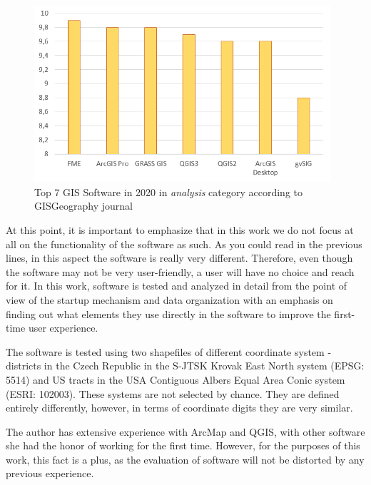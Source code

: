 \documentclass[a4paper,10pt,twoside]{article}
\begin{document}
\begin{figure}[hbt!] 
\begin{center}
\includegraphics[width=11cm]{../pictures/hodnoceni_analysis.png} 
\caption[Top 7 GIS Software in 2020 in \textit{analysis} category according to GISGeography journal]{Top 7 GIS Software in 2020 in \textit{analysis} category according to GISGeography journal}
\label{fig:hodnoceni_analysis}
\end{center}
\end{figure}

\noindent At this point, it is important to emphasize that in this work we do not focus at all on the functionality of the software as such. As you could read in the previous lines, in this aspect the software is really very different. Therefore, even though the software may not be very user-friendly, a user will have no choice and reach for it. In this work, software is tested and analyzed in detail from the point of view of the startup mechanism and data organization with an emphasis on finding out what elements they use directly in the software to improve the first-time user experience.

The software is tested using two shapefiles of different coordinate system - districts in the Czech Republic in the S-JTSK Krovak East North system (EPSG: 5514) and US tracts in the USA Contiguous Albers Equal Area Conic system (ESRI: 102003). These systems are not selected by chance. They are defined entirely differently, however, in terms of coordinate digits they are very similar.

The author has extensive experience with ArcMap and QGIS, with other software she had the honor of working for the first time. However, for the purposes of this work, this fact is a plus, as the evaluation of software will not be distorted by any previous experience.

\newpage
\vspace*{-1cm}
\end{document}
